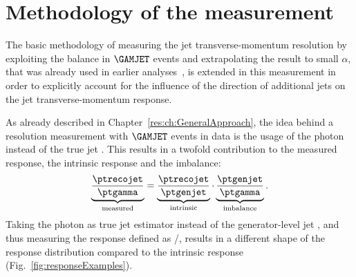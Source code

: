 \chapter{Methodology of the measurement}
\label{res:ch:methodology}

The basic methodology of measuring the jet transverse-momentum resolution by exploiting the \pt balance in $\GAMJET$ events and extrapolating the result to small $\alpha$, that was already used in earlier analyses~\cite{bib:CMS:JERCPaper_2011,CMS:PAS:JETResolution_7TeV}, is extended in this measurement in order to explicitly account for the influence of the direction of additional jets on the jet transverse-momentum response.

As already described in Chapter~\ref{res:ch:GeneralApproach}, the idea behind a resolution measurement with $\GAMJET$ events in data is the usage of the photon \pt instead of the true jet \pt.
This results in a twofold contribution to the measured response, the intrinsic response and the imbalance:
\begin{equation}\label{eq:splittedResolution}
\underbrace{\frac{\ptrecojet}{\ptgamma}}_{\text{measured}} = \underbrace{\frac{\ptrecojet}{\ptgenjet}}_{\text{intrinsic}} \cdot \underbrace{\frac{\ptgenjet}{\ptgamma}}_{\text{imbalance}}.
\end{equation}
Taking the photon \pt as true jet \pt estimator instead of the generator-level jet \pt, and thus measuring the response defined as \ptrecojet/\ptgamma, results in a different shape of the response distribution compared to the intrinsic response (Fig.~\ref{fig:responseExamples}). 
